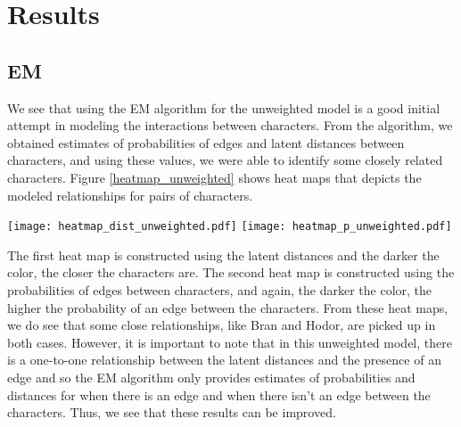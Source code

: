 \documentclass{article}
\begin{document}
\section{Results} \label{Results}

\subsection{EM}
We see that using the EM algorithm for the unweighted model is a good initial attempt in modeling the interactions between characters. From the algorithm, we obtained estimates of probabilities of edges and latent distances between characters, and using these values, we were able to identify some closely related characters. Figure \ref{heatmap_unweighted} shows heat maps that depicts the modeled relationships for pairs of characters. 

\begin{center}\label{heatmap_unweighted}
\texttt{[image: heatmap\_dist\_unweighted.pdf]}
\texttt{[image: heatmap\_p\_unweighted.pdf]}
\end{center}

The first heat map is constructed using the latent distances and the darker the color, the closer the characters are. The second heat map is constructed using the probabilities of edges between characters, and again, the darker the color, the higher the probability of an edge between the characters. From these heat maps, we do see that some close relationships, like Bran and Hodor, are picked up in both cases. However, it is important to note that in this unweighted model, there is a one-to-one relationship between the latent distances and the presence of an edge and so the EM algorithm only provides estimates of probabilities and distances for when there is an edge and when there isn't an edge between the characters. Thus, we see that these results can be improved.
\end{document}
